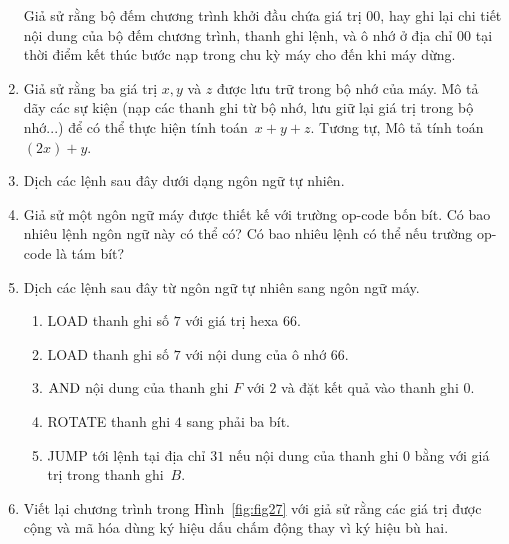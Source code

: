 \begin{multicols}{2}
\begin{enumerate}
    Giả sử rằng bộ đếm chương trình khởi đầu chứa giá trị $00$, hay ghi lại chi tiết nội
    dung của bộ đếm chương trình, thanh ghi lệnh, và ô nhớ ở địa chỉ $00$ tại thời điểm
    kết thúc bước nạp trong chu kỳ máy cho đến khi máy dừng.

  \item Giả sử rằng ba giá trị $x, y$ và $z$ được lưu trữ trong bộ nhớ của máy. Mô tả dãy
    các sự kiện (nạp các thanh ghi từ bộ nhớ, lưu giữ lại giá trị trong bộ nhớ...) để có
    thể thực hiện tính toán~$x + y + z$. Tương tự, Mô tả tính toán~$(2x) +y$.

  \item Dịch các lệnh sau đây dưới dạng ngôn ngữ tự nhiên.


  \item Giả sử một ngôn ngữ máy được thiết kế với trường op-code bốn bít. Có bao nhiêu
    lệnh ngôn ngữ này có thể có? Có bao nhiêu lệnh có thể nếu trường op-code là tám bít?

  \item Dịch các lệnh sau đây từ ngôn ngữ tự nhiên sang ngôn ngữ máy.
    \begin{enumerate}
    \item LOAD thanh ghi số $7$ với giá trị hexa $66$.

    \item LOAD thanh ghi số $7$ với nội dung của ô nhớ $66$.

    \item $\operatorname{\mbox{AND}}$ nội dung của thanh ghi $F$ với $2$ và đặt kết quả vào thanh ghi $0$.

    \item ROTATE thanh ghi $4$ sang phải ba bít.

    \item JUMP tới lệnh tại địa chỉ $31$ nếu nội dung của thanh ghi $0$ bằng với giá trị
      trong thanh ghi~$B$.
    \end{enumerate}

  \item Viết lại chương trình trong Hình~\ref{fig:fig27} với giả sử rằng các giá trị được
    cộng và mã hóa dùng ký hiệu dấu chấm động thay vì ký hiệu bù hai.



\end{enumerate}
\end{multicols}

